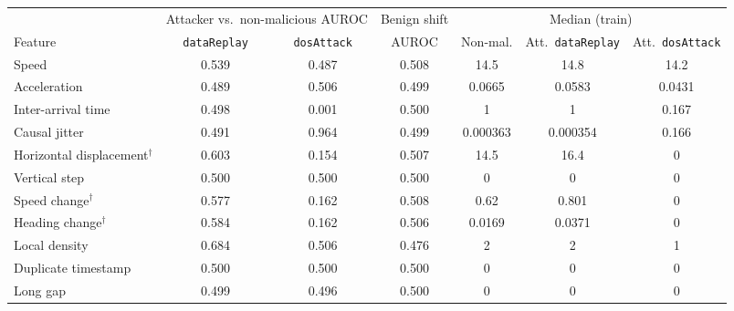 \begin{tabular}{lcccccc}
\toprule
& \multicolumn{2}{c}{Attacker vs.\ non-malicious AUROC} & Benign shift & \multicolumn{3}{c}{Median (train)} \\
\cmidrule(lr){2-3}\cmidrule(lr){5-7}
Feature & \texttt{dataReplay} & \texttt{dosAttack} & AUROC & Non-mal. & Att.\ \texttt{dataReplay} & Att.\ \texttt{dosAttack} \\
\midrule
Speed & 0.539 & 0.487 & 0.508 & 14.5 & 14.8 & 14.2 \\
Acceleration & 0.489 & 0.506 & 0.499 & 0.0665 & 0.0583 & 0.0431 \\
Inter-arrival time & 0.498 & 0.001 & 0.500 & 1 & 1 & 0.167 \\
Causal jitter & 0.491 & 0.964 & 0.499 & 0.000363 & 0.000354 & 0.166 \\
Horizontal displacement$^\dagger$ & 0.603 & 0.154 & 0.507 & 14.5 & 16.4 & 0 \\
Vertical step & 0.500 & 0.500 & 0.500 & 0 & 0 & 0 \\
Speed change$^\dagger$ & 0.577 & 0.162 & 0.508 & 0.62 & 0.801 & 0 \\
Heading change$^\dagger$ & 0.584 & 0.162 & 0.506 & 0.0169 & 0.0371 & 0 \\
Local density & 0.684 & 0.506 & 0.476 & 2 & 2 & 1 \\
Duplicate timestamp & 0.500 & 0.500 & 0.500 & 0 & 0 & 0 \\
Long gap & 0.499 & 0.496 & 0.500 & 0 & 0 & 0 \\
\bottomrule
\end{tabular}
